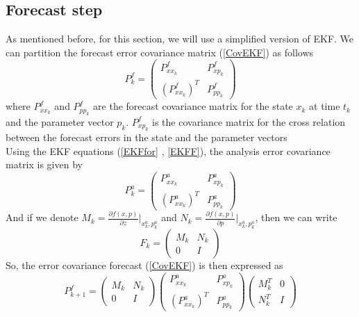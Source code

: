 \documentclass[a4,12pt]{article}
\numberwithin{equation}{section}
\begin{document}
\subsection{Forecast step}
As mentioned before, for this section, we will use a simplified version of EKF. We can partition the forecast error covariance matrix  (\ref{CovEKF}) as follows
\begin{equation}
    P_k^f = 
\begin{pmatrix}
P_{xx_k}^f  & P_{xp_k}^f \\
(P_{xx_k}^f)^T &  P_{pp_k}^f 
\end{pmatrix}  
\end{equation}
where $P_{xx_k}^f $  and $P_{pp_k}^f $ are the forecast covariance matrix for the state $x_k$ at time $t_k$ and the parameter vector $p_k$. $P_{xp_k}^f $ is the covariance matrix for the cross relation between the forecast errors in the state and the parameter vectors \\
Using the EKF equations (\ref{EKFfor} , \ref{EKFF}), the analysis error covariance matrix is given by
\begin{equation}
    P_k^a = 
\begin{pmatrix}
P_{xx_k}^a & P_{xp_k}^a \\
(P_{xx_k}^a)^T &  P_{pp_k}^a
\end{pmatrix}  
\end{equation}
And if we denote $M_k = \frac{\partial f(x,p) }{ \partial z} \big|_{x_k^a, p_k^a} $ and $N_k = \frac{\partial f(x,p)}{  \partial p } \big|_{x_k^a, p_k^a}$, then we can write 
\begin{equation}
    F_k = 
\begin{pmatrix}
M_k & N_k \\
 0  & I
\end{pmatrix}  
\end{equation}
So, the error covariance forecast (\ref{CovEKF})  is then expressed as
\begin{equation}
    P_{k+1}^f =  
\begin{pmatrix}
M_k & N_k \\
 0  & I
\end{pmatrix}
\begin{pmatrix}
P_{xx_k}^a & P_{xp_k}^a \\
(P_{xx_k}^a)^T &  P_{pp_k}^a
\end{pmatrix}
\begin{pmatrix}
M_k^T & 0 \\
 N_k^T & I
\end{pmatrix}
\end{equation}
\end{document}
